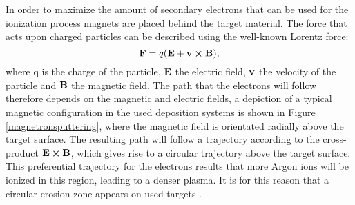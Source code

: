In order to maximize the amount of secondary electrons that can be used for the ionization process magnets are placed behind the target material. The force that acts upon charged particles can be described using the well-known Lorentz force:
\begin{equation}
	\vb{F} = q(\vb{E} + \vb{v} \cross \vb{B}),
\end{equation}
where q is the charge of the particle, $\vb{E}$ the electric field, $\vb{v}$ the velocity of the particle and $\vb{B}$ the magnetic field. The path that the electrons will follow therefore depends on the magnetic and electric fields, a depiction of a typical magnetic configuration in the used deposition systems is shown in Figure \ref{magnetronsputtering}, where the magnetic field is orientated radially above the target surface. The resulting path will follow a trajectory according to the cross-product  $\vb{E} \cross \vb{B}$, which gives rise to a circular trajectory above the target surface. This preferential trajectory for the electrons results that more Argon ions will be ionized in this region, leading to a denser plasma. It is for this reason that a circular erosion zone appears on used targets \cite{sputterprocess}. 

